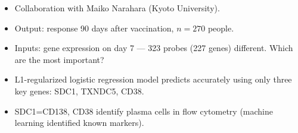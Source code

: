 \documentclass{beamer}
\begin{document}
\begin{frame}
\begin{itemize}
\item Collaboration with Maiko Narahara (Kyoto University).
\item Output: response 90 days after vaccination, $n=270$ people.
\item Inputs: gene expression on day 7 --- 323 probes (227 genes)
  different. Which are the most important?
\item<2> L1-regularized logistic regression model predicts accurately
using only three key genes: SDC1, TXNDC5, CD38.
\item<2> SDC1=CD138, CD38 identify plasma cells in flow cytometry
  (machine learning identified known markers).
\end{itemize}






\end{frame}
\end{document}
